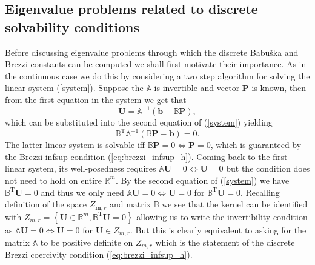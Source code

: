 \documentclass[a4paper,10pt]{article}
\newcommand{\R}{\ensuremath{\mathbb{R}}}
\newcommand{\mm}{\ensuremath{\mathbf{m}}}
\newcommand{\Amat}{\ensuremath{\mathbb{A}}}
\newcommand{\Bmat}{\ensuremath{\mathbb{B}}}
\newcommand{\Bmatt}{\ensuremath{\mathbb{B}^{\text{T}}}}
\newcommand{\Uvec}{\ensuremath{\mathbf{U}}}
\newcommand{\bvec}{\ensuremath{\mathbf{b}}}
\newcommand{\Pvec}{\ensuremath{\mathbf{P}}}
\begin{document}
  \subsection{Eigenvalue problems related to discrete solvability conditions}
  Before discussing eigenvalue problems through which the discrete Babu\v ska
  and Brezzi constants can be computed we shall first motivate their importance.
  As in the continuous case we do this by considering a two step algorithm
  for solving the linear system (\ref{system}). Suppose the $\Amat$ is
  invertible and vector $\Pvec$ is known, then from the first equation in the
  system we get that 
  \begin{equation}
    \label{eq:sys_step1}
    \Uvec = \Amat^{-1}\left(\bvec - \Bmat\Pvec\right),
  \end{equation}
  which can be substituted into the second equation of (\ref{system})
  yielding
  \begin{equation}
    \label{eq:sys_step2}
    \Bmatt\Amat^{-1}\left(\Bmat\Pvec-\bvec\right) = 0.
  \end{equation}
  The latter linear system is solvable iff $\Bmat\Pvec=0\Leftrightarrow\Pvec=0$,
  which is guaranteed by the Brezzi infsup condition (\ref{eq:brezzi_infsup_h}).
  Coming back to the first linear system, its well-posedness requires
  $\Amat\Uvec=0\Leftrightarrow\Uvec=0$ but the condition does not need to hold
  on entire $\R^m$. By the second equation of (\ref{system}) we have
  $\Bmatt\Uvec=0$ and thus we only need $\Amat\Uvec=0\Leftrightarrow\Uvec=0$ for
  $\Bmatt\Uvec=0$. Recalling definition of the space $Z_{\mm, r}$ and matrix
  $\Bmat$ we see that the kernel can be identified with $Z_{m,
  r}=\left\{\Uvec\in\R^m, \Bmatt\Uvec=0\right\}$ allowing us to write the
  invertibility condition as $\Amat\Uvec=0\Leftrightarrow\Uvec=0$ for
  $\Uvec\in Z_{m, r}$. But this is clearly equivalent to asking for the matrix
  $\Amat$ to be positive definite on $Z_{m, r}$ which is the statement of the
  discrete Brezzi coercivity condition (\ref{eq:brezzi_infsup_h}).
\end{document}
